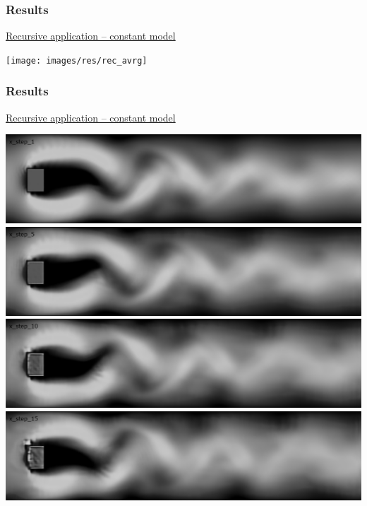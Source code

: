 \documentclass[18pt]{beamer}
\begin{document}
\begin{frame}[t]
  \frametitle{Results}
  \vspace{-1cm}
  \begin{center}
    {\large \underline{Recursive application -- constant model}} \\
  \end{center}
  \begin{center}
    \texttt{[image: images/res/rec\_avrg]}
  \end{center}
\end{frame}

\begin{frame}[t]
  \frametitle{Results}
  \vspace{-1cm}
  \begin{center}
    {\large \underline{Recursive application -- constant model}} \\
  \end{center}
  \vspace{1cm}
  \begin{center}
    \includegraphics[scale=0.15]{images/res/x_step_1}
    \includegraphics[scale=0.15]{images/res/x_step_5}
    \includegraphics[scale=0.15]{images/res/x_step_10}
    \includegraphics[scale=0.15]{images/res/x_step_15}

\end{center}
\end{frame}
\end{document}
